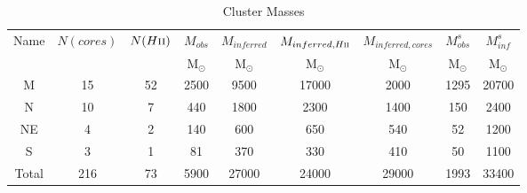 \begin{table*}[htp]
\centering
\caption{Cluster Masses}
\begin{tabular}{ccccccccc}
\label{tab:clustermassestimates}
Name & $N(cores)$ & $N(H\textsc{ii})$ & $M_{obs}$ & $M_{inferred}$ & $M_{inferred, H\textsc{ii}}$ & $M_{inferred, cores}$ & $M_{obs}^s$ & $M_{inf}^s$ \\
 &  &  & $\mathrm{M_{\odot}}$ & $\mathrm{M_{\odot}}$ & $\mathrm{M_{\odot}}$ & $\mathrm{M_{\odot}}$ & $\mathrm{M_{\odot}}$ & $\mathrm{M_{\odot}}$ \\
\hline
M & 15 & 52 & 2500 & 9500 & 17000 & 2000 & 1295 & 20700 \\
N & 10 & 7 & 440 & 1800 & 2300 & 1400 & 150 & 2400 \\
NE & 4 & 2 & 140 & 600 & 650 & 540 & 52 & 1200 \\
S & 3 & 1 & 81 & 370 & 330 & 410 & 50 & 1100 \\
Total & 216 & 73 & 5900 & 27000 & 24000 & 29000 & 1993 & 33400 \\
\hline
\end{tabular}
\end{table*}
